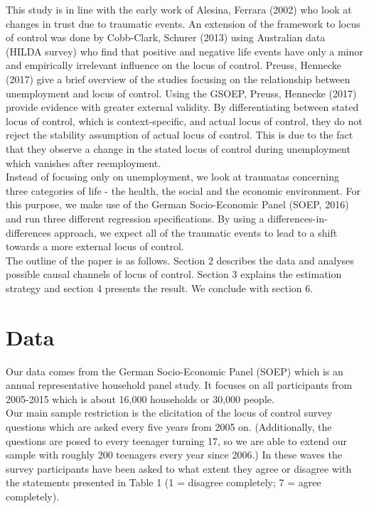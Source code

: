 \documentclass[12pt,a4paper,fleqn]{article}
\begin{document}
This study is in line with the early work of Alesina, Ferrara (2002) who look at changes in trust due to traumatic events. An extension of the framework to locus of control was done by Cobb-Clark, Schurer (2013) using Australian data (HILDA survey) who find that positive and negative life events have only a minor and empirically irrelevant  influence on the locus of control. 
Preuss, Hennecke (2017) give a brief overview of the studies focusing on the relationship between unemployment and locus of control. Using the GSOEP, Preuss, Hennecke (2017) provide evidence with greater external validity. By differentiating between stated locus of control, which is context-specific, and actual locus of control, they do not reject the stability assumption of actual locus of control. This is due to the fact that they observe a change in the stated locus of control during unemployment which vanishes after reemployment. \\
Instead of focusing only on unemployment, we look at traumatas concerning three categories of life - the health, the social and the economic environment.  For this purpose, we make use of the German Socio-Economic Panel (SOEP, 2016) and run three different regression specifications. By using a differences-in-differences approach, we expect all of the traumatic events to lead to a shift towards a more external locus of control.\\
The outline of the paper is as follows. Section 2 describes the data and analyses possible causal channels of locus of control. Section 3 explains the estimation strategy and section 4 presents the result. We conclude with section 6. 

\section{Data}
Our data comes from the German Socio-Economic Panel (SOEP) which is an annual representative household panel study. It focuses on all participants from 2005-2015 which is about 16,000 households or 30,000 people. \\
Our main sample restriction is the elicitation of the locus of control survey questions which are asked every five years from 2005 on. (Additionally, the questions are posed to every teenager turning 17, so we are able to extend our sample with roughly 200 teenagers every year since 2006.)
In these waves the survey participants have been asked to what extent they agree or disagree with the statements presented in Table 1 (1 = disagree completely; 7 = agree completely).\\
\end{document}
